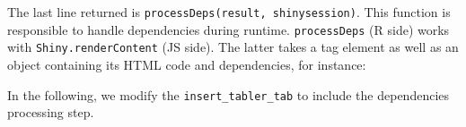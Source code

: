 \documentclass[]{book}
\newenvironment{Shaded}{\begin{snugshade}}{\end{snugshade}}
\newcommand{\AttributeTok}[1]{\textcolor[rgb]{0.77,0.63,0.00}{#1}}
\newcommand{\DataTypeTok}[1]{\textcolor[rgb]{0.13,0.29,0.53}{#1}}
\newcommand{\DecValTok}[1]{\textcolor[rgb]{0.00,0.00,0.81}{#1}}
\newcommand{\NormalTok}[1]{#1}
\newcommand{\OperatorTok}[1]{\textcolor[rgb]{0.81,0.36,0.00}{\textbf{#1}}}
\newcommand{\VariableTok}[1]{\textcolor[rgb]{0.00,0.00,0.00}{#1}}
\begin{document}
The last line returned is \texttt{processDeps(result,\ shinysession)}. This function is responsible to handle dependencies during runtime. \texttt{processDeps} (R side) works with \texttt{Shiny.renderContent} (JS side).
The latter takes a tag element as well as an object containing its HTML code and dependencies, for instance:

\begin{Shaded}
\end{Shaded}

In the following, we modify the \texttt{insert\_tabler\_tab} to include the dependencies processing step.
\end{document}
